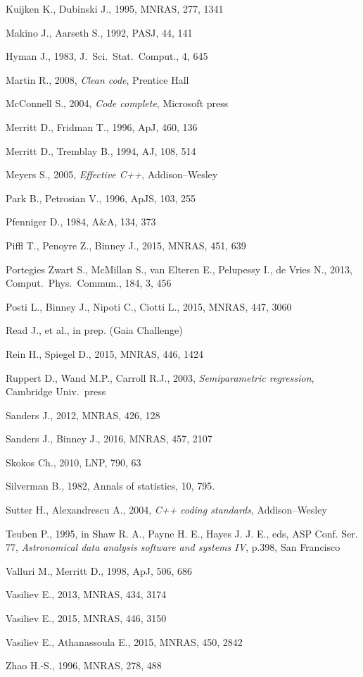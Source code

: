 \documentclass[12pt]{article}
\begin{document}
\begin{thebibliography}{99}
Kuijken K., Dubinski J., 1995, MNRAS, 277, 1341

Makino J., Aarseth S., 1992, PASJ, 44, 141

Hyman J., 1983, J.~Sci.~Stat.~Comput., 4, 645

Martin R., 2008, \textsl{Clean code}, Prentice Hall

McConnell S., 2004, \textsl{Code complete}, Microsoft press

Merritt D., Fridman T., 1996, ApJ, 460, 136

Merritt D., Tremblay B., 1994, AJ, 108, 514

Meyers S., 2005, \textsl{Effective C++}, Addison--Wesley

Park B., Petrosian V., 1996, ApJS, 103, 255

Pfenniger D., 1984, A\&A, 134, 373

Piffl T., Penoyre Z., Binney J., 2015, MNRAS, 451, 639

Portegies Zwart S., McMillan S., van Elteren E., Pelupessy I., de Vries N., 2013, Comput.\ Phys.\ Commun., 184, 3, 456

Posti L., Binney J., Nipoti C., Ciotti L., 2015, MNRAS, 447, 3060

Read J., et al., in prep. (Gaia Challenge)

Rein H., Spiegel D., 2015, MNRAS, 446, 1424

Ruppert D., Wand M.P., Carroll R.J., 2003, \textsl{Semiparametric regression}, Cambridge Univ.\ press

Sanders J., 2012, MNRAS, 426, 128

Sanders J., Binney J., 2016, MNRAS, 457, 2107

Skokos Ch., 2010, LNP, 790, 63

Silverman B., 1982, Annals of statistics, 10, 795.

Sutter H., Alexandrescu A., 2004, \textsl{C++ coding standards}, Addison--Wesley

Teuben P., 1995, in Shaw R. A., Payne H. E., Hayes J. J. E., eds, ASP Conf. Ser. 77,
\textsl{Astronomical data analysis software and systems IV}, p.398, San Francisco

Valluri M., Merritt D., 1998, ApJ, 506, 686

Vasiliev E., 2013, MNRAS, 434, 3174

Vasiliev E., 2015, MNRAS, 446, 3150

Vasiliev E., Athanassoula E., 2015, MNRAS, 450, 2842

Zhao H.-S., 1996, MNRAS, 278, 488

\end{thebibliography}
\end{document}
